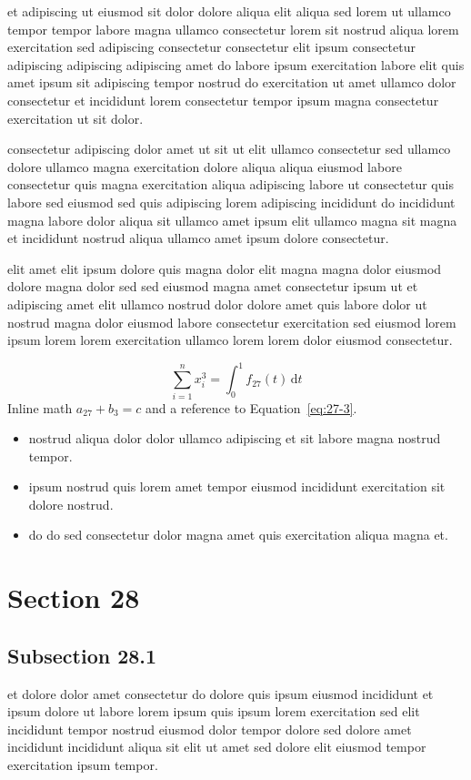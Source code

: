 \documentclass{article}
\begin{document}
et adipiscing ut eiusmod sit dolor dolore aliqua elit aliqua sed lorem ut ullamco tempor tempor labore magna ullamco consectetur lorem sit nostrud aliqua lorem exercitation sed adipiscing consectetur consectetur elit ipsum consectetur adipiscing adipiscing adipiscing amet do labore ipsum exercitation labore elit quis amet ipsum sit adipiscing tempor nostrud do exercitation ut amet ullamco dolor consectetur et incididunt lorem consectetur tempor ipsum magna consectetur exercitation ut sit dolor.

consectetur adipiscing dolor amet ut sit ut elit ullamco consectetur sed ullamco dolore ullamco magna exercitation dolore aliqua aliqua eiusmod labore consectetur quis magna exercitation aliqua adipiscing labore ut consectetur quis labore sed eiusmod sed quis adipiscing lorem adipiscing incididunt do incididunt magna labore dolor aliqua sit ullamco amet ipsum elit ullamco magna sit magna et incididunt nostrud aliqua ullamco amet ipsum dolore consectetur.

elit amet elit ipsum dolore quis magna dolor elit magna magna dolor eiusmod dolore magna dolor sed sed eiusmod magna amet consectetur ipsum ut et adipiscing amet elit ullamco nostrud dolor dolore amet quis labore dolor ut nostrud magna dolor eiusmod labore consectetur exercitation sed eiusmod lorem ipsum lorem lorem exercitation ullamco lorem lorem dolor eiusmod consectetur.

\begin{equation}\label{eq:27-3}
  \sum_{i=1}^{n} x_i^{3} = \int_0^1 f_{27}(t)\,\mathrm{d}t
\end{equation}
Inline math $a_{27} + b_{3} = c$ and a reference to Equation~\eqref{eq:27-3}.

\begin{itemize}
  \item nostrud aliqua dolor dolor ullamco adipiscing et sit labore magna nostrud tempor.
  \item ipsum nostrud quis lorem amet tempor eiusmod incididunt exercitation sit dolore nostrud.
  \item do do sed consectetur dolor magna amet quis exercitation aliqua magna et.
\end{itemize}

\section{Section 28}\label{sec:28}
\subsection{Subsection 28.1}\label{sec:28-1}
et dolore dolor amet consectetur do dolore quis ipsum eiusmod incididunt et ipsum dolore ut labore lorem ipsum quis ipsum lorem exercitation sed elit incididunt tempor nostrud eiusmod dolor tempor dolore sed dolore amet incididunt incididunt aliqua sit elit ut amet sed dolore elit eiusmod tempor exercitation ipsum tempor.
\end{document}
